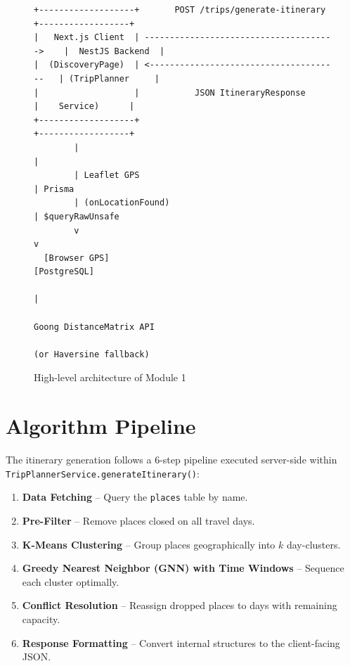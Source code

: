 \documentclass[12pt,a4paper]{report}
\begin{document}
\begin{figure}[H]
\centering
\begin{verbatim}
+-------------------+       POST /trips/generate-itinerary       +------------------+
|   Next.js Client  | -------------------------------------->    |  NestJS Backend  |
|  (DiscoveryPage)  | <--------------------------------------   | (TripPlanner     |
|                   |           JSON ItineraryResponse           |    Service)      |
+-------------------+                                            +------------------+
        |                                                               |
        | Leaflet GPS                                                   | Prisma
        | (onLocationFound)                                             | $queryRawUnsafe
        v                                                               v
  [Browser GPS]                                                   [PostgreSQL]
                                                                        |
                                                              Goong DistanceMatrix API
                                                              (or Haversine fallback)
\end{verbatim}
\caption{High-level architecture of Module 1}
\end{figure}

\section{Algorithm Pipeline}
\label{sec:algorithm-pipeline}

The itinerary generation follows a 6-step pipeline executed server-side within \texttt{TripPlannerService.generateItinerary()}:

\begin{enumerate}
    \item \textbf{Data Fetching} -- Query the \texttt{places} table by name.
    \item \textbf{Pre-Filter} -- Remove places closed on all travel days.
    \item \textbf{K-Means Clustering} -- Group places geographically into $k$ day-clusters.
    \item \textbf{Greedy Nearest Neighbor (GNN) with Time Windows} -- Sequence each cluster optimally.
    \item \textbf{Conflict Resolution} -- Reassign dropped places to days with remaining capacity.
    \item \textbf{Response Formatting} -- Convert internal structures to the client-facing JSON.
\end{enumerate}
\end{document}
